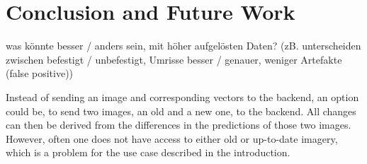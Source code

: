 
\chapter{Conclusion and Future Work}

was könnte besser / anders sein, mit höher aufgelösten Daten? (zB. unterscheiden zwischen befestigt / unbefestigt, Umrisse besser / genauer, weniger Artefakte (false positive))

Instead of sending an image and corresponding vectors to the backend, an option could be, to send two images, an old and a new one, to the backend. All changes can then be derived
from the differences in the predictions of those two images. However, often one does not have access to either old or up-to-date imagery,
which is a problem for the use case described in the introduction.